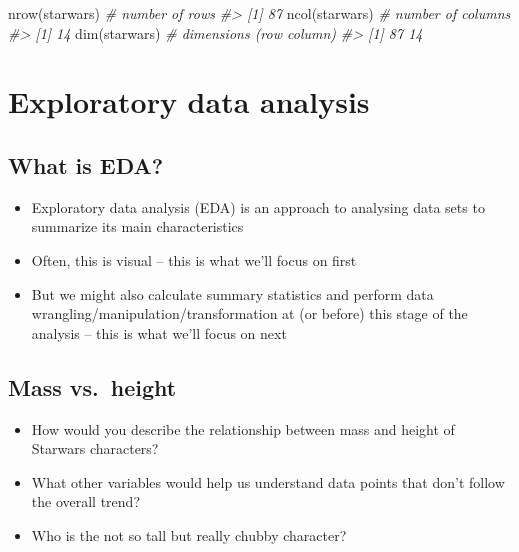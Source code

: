 \documentclass[
]{book}
\newenvironment{Shaded}{\begin{snugshade}}{\end{snugshade}}
\newcommand{\CommentTok}[1]{\textcolor[rgb]{0.56,0.35,0.01}{\textit{#1}}}
\newcommand{\FunctionTok}[1]{\textcolor[rgb]{0.00,0.00,0.00}{#1}}
\newcommand{\NormalTok}[1]{#1}
\providecommand{\tightlist}{%
  \setlength{\itemsep}{0pt}\setlength{\parskip}{0pt}}
\theoremstyle{definition}
\theoremstyle{definition}
\theoremstyle{definition}
\theoremstyle{definition}
\theoremstyle{remark}
\begin{document}
\begin{Shaded}
\begin{Highlighting}[]
\FunctionTok{nrow}\NormalTok{(starwars) }\CommentTok{\# number of rows}
\CommentTok{\#\textgreater{} [1] 87}
\FunctionTok{ncol}\NormalTok{(starwars) }\CommentTok{\# number of columns}
\CommentTok{\#\textgreater{} [1] 14}
\FunctionTok{dim}\NormalTok{(starwars)  }\CommentTok{\# dimensions (row column)}
\CommentTok{\#\textgreater{} [1] 87 14}
\end{Highlighting}
\end{Shaded}

\hypertarget{exploratory-data-analysis-1}{%
\chapter{Exploratory data analysis}\label{exploratory-data-analysis-1}}

\hypertarget{what-is-eda-1}{%
\section{What is EDA?}\label{what-is-eda-1}}

\begin{itemize}
\tightlist
\item
  Exploratory data analysis (EDA) is an approach to analysing data sets to summarize its main characteristics
\item
  Often, this is visual -- this is what we'll focus on first
\item
  But we might also calculate summary statistics and perform data wrangling/manipulation/transformation at (or before) this stage of the analysis -- this is what we'll focus on next
\end{itemize}

\hypertarget{mass-vs.-height-2}{%
\section{Mass vs.~height}\label{mass-vs.-height-2}}

\begin{itemize}
\tightlist
\item
  How would you describe the relationship between mass and height of Starwars characters?
\item
  What other variables would help us understand data points that don't follow the overall trend?
\item
  Who is the not so tall but really chubby character?
\end{itemize}
\end{document}
